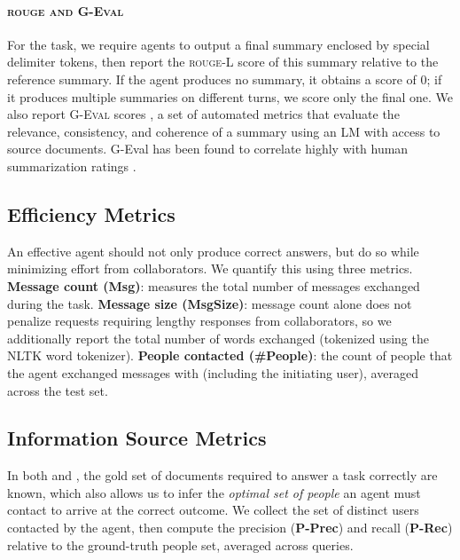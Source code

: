 \paragraph{\textsc{rouge and G-Eval}} 
For the \datanews{} task, we require agents to output a final summary enclosed by special delimiter tokens, then report the \textsc{rouge-L} score \citep{lin2004rouge} of this summary relative to the reference summary. If the agent produces no summary, it obtains a score of 0; if it produces multiple summaries on different turns,%
 we score only the final one.
 We also report \textsc{G-Eval} scores \citep{DBLP:conf/emnlp/LiuIXWXZ23}, a set of automated metrics that evaluate the relevance, consistency, and coherence of a summary using an LM with access to %
source documents.
 G-Eval has been found to correlate highly with human summarization ratings \cite{DBLP:conf/acl/SongSSCM24}.



\subsection{Efficiency Metrics}

An effective agent should not only produce correct answers, but do so while minimizing effort from collaborators. We quantify this using three metrics.
\textbf{Message count (Msg)}: measures the total number of messages exchanged during the task.
\textbf{Message size (MsgSize)}: message count alone does not penalize requests requiring lengthy responses from collaborators, so we additionally report the total number of words exchanged (tokenized using the NLTK \cite{bird2009natural} word tokenizer). %
\textbf{People contacted (\#People)}: the count of people that the agent exchanged messages with (including the initiating user), averaged across the test set.



\subsection{Information Source Metrics}

In both \dataspider{} and \datanews{}, the gold set of documents required to answer a task correctly are known, which also allows us to infer the \emph{optimal set of people} an agent must contact to arrive at the correct outcome. We collect the set of distinct users contacted by the agent, then compute the precision (\textbf{P-Prec}) and recall (\textbf{P-Rec}) relative to the ground-truth people set, averaged across queries.



